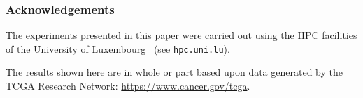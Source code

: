 \subsubsection*{Acknowledgements}

The experiments presented in this paper were carried out using the HPC facilities of the University of Luxembourg~\parencite{Varette2022} (see \texttt{\href{http://hpc.uni.lu}{hpc.uni.lu}}).

The results shown here are in whole or part based upon data generated by the TCGA Research Network: \url{https://www.cancer.gov/tcga}.
